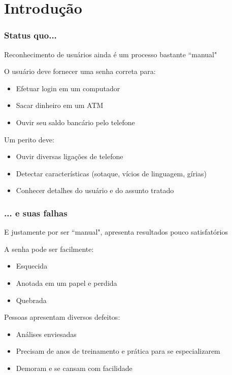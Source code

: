 \section{Introdução}
\label{sec:intro}

\contentscurrent

\begin{frame}
\frametitle{Status quo...}
\begin{description}
    \item Reconhecimento de usuários ainda é um processo bastante ``manual"
    \pause
    \item[Verificação] O usuário deve fornecer uma senha correta para:
    \pause
    \begin{itemize}
        \item Efetuar login em um computador
        \pause
        \item Sacar dinheiro em um ATM
        \pause
        \item Ouvir seu saldo bancário pelo telefone
        \pause
    \end{itemize}
    \item[Identificação] Um perito deve:
    \pause
    \begin{itemize}
        \item Ouvir diversas ligações de telefone
        \pause
        \item Detectar características (sotaque, vícios de linguagem, gírias)
        \pause
        \item Conhecer detalhes do usuário e do assunto tratado
    \end{itemize}
\end{description}
\end{frame}

\begin{frame}
\frametitle{... e suas falhas}
\begin{description}
    \item E justamente por ser ``manual", apresenta resultados pouco satisfatórios
    \pause
    \item[Verificação] A senha pode ser facilmente:
    \pause
    \begin{itemize}
        \item Esquecida
        \pause
        \item Anotada em um papel e perdida
        \pause
        \item Quebrada
        \pause
    \end{itemize}
    \item[Identificação] Pessoas apresentam diversos defeitos:
    \pause
    \begin{itemize}
        \item Análises enviesadas
        \pause
        \item Precisam de anos de treinamento e prática para se especializarem
        \pause
        \item Demoram e se cansam com facilidade
    \end{itemize}
\end{description}
\end{frame}

